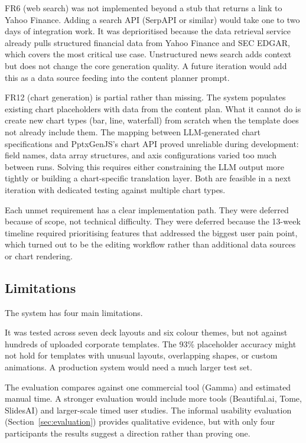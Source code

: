 FR6 (web search) was not implemented beyond a stub that returns a link to Yahoo Finance. Adding a search API (SerpAPI or similar) would take one to two days of integration work. It was deprioritised because the data retrieval service already pulls structured financial data from Yahoo Finance and SEC EDGAR, which covers the most critical use case. Unstructured news search adds context but does not change the core generation quality. A future iteration would add this as a data source feeding into the content planner prompt.

FR12 (chart generation) is partial rather than missing. The system populates existing chart placeholders with data from the content plan. What it cannot do is create new chart types (bar, line, waterfall) from scratch when the template does not already include them. The mapping between LLM-generated chart specifications and PptxGenJS's chart API proved unreliable during development: field names, data array structures, and axis configurations varied too much between runs. Solving this requires either constraining the LLM output more tightly or building a chart-specific translation layer. Both are feasible in a next iteration with dedicated testing against multiple chart types.

Each unmet requirement has a clear implementation path. They were deferred because of scope, not technical difficulty. They were deferred because the 13-week timeline required prioritising features that addressed the biggest user pain point, which turned out to be the editing workflow rather than additional data sources or chart rendering.

\subsection{Limitations}

The system has four main limitations.

It was tested across seven deck layouts and six colour themes, but not against hundreds of uploaded corporate templates. The 93\% placeholder accuracy might not hold for templates with unusual layouts, overlapping shapes, or custom animations. A production system would need a much larger test set.

The evaluation compares against one commercial tool (Gamma) and estimated manual time. A stronger evaluation would include more tools (Beautiful.ai, Tome, SlidesAI) and larger-scale timed user studies. The informal usability evaluation (Section~\ref{sec:evaluation}) provides qualitative evidence, but with only four participants the results suggest a direction rather than proving one.

